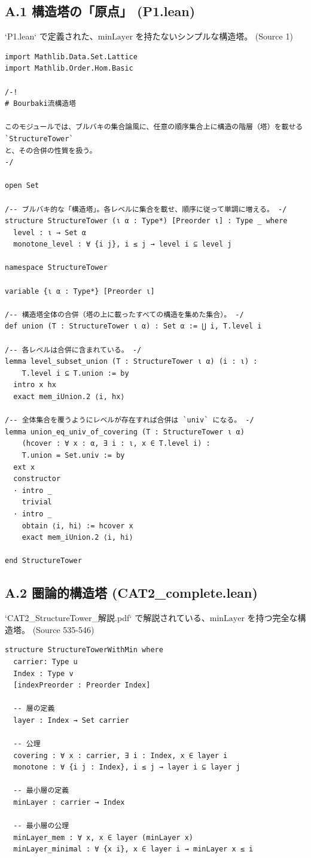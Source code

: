 \documentclass[11pt]{ltjsarticle}
\theoremstyle{definition}
\theoremstyle{plain}
\theoremstyle{remark}
\begin{document}
\subsection{A.1 構造塔の「原点」 (P1.lean)}
`P1.lean` で定義された、$\text{minLayer}$ を持たないシンプルな構造塔。
(Source 1)
\begin{lstlisting}[caption={P1.lean: StructureTower の定義}, label={lst:p1}]
import Mathlib.Data.Set.Lattice
import Mathlib.Order.Hom.Basic

/-!
# Bourbaki流構造塔

このモジュールでは、ブルバキの集合論風に、任意の順序集合上に構造の階層（塔）を載せる `StructureTower`
と、その合併の性質を扱う。
-/

open Set

/-- ブルバキ的な「構造塔」。各レベルに集合を載せ、順序に従って単調に増える。 -/
structure StructureTower (ι α : Type*) [Preorder ι] : Type _ where
  level : ι → Set α
  monotone_level : ∀ {i j}, i ≤ j → level i ⊆ level j

namespace StructureTower

variable {ι α : Type*} [Preorder ι]

/-- 構造塔全体の合併（塔の上に載ったすべての構造を集めた集合）。 -/
def union (T : StructureTower ι α) : Set α := ⋃ i, T.level i

/-- 各レベルは合併に含まれている。 -/
lemma level_subset_union (T : StructureTower ι α) (i : ι) :
    T.level i ⊆ T.union := by
  intro x hx
  exact mem_iUnion.2 ⟨i, hx⟩

/-- 全体集合を覆うようにレベルが存在すれば合併は `univ` になる。 -/
lemma union_eq_univ_of_covering (T : StructureTower ι α)
    (hcover : ∀ x : α, ∃ i : ι, x ∈ T.level i) :
    T.union = Set.univ := by
  ext x
  constructor
  · intro _
    trivial
  · intro _
    obtain ⟨i, hi⟩ := hcover x
    exact mem_iUnion.2 ⟨i, hi⟩

end StructureTower
\end{lstlisting}

\subsection{A.2 圏論的構造塔 (CAT2\_complete.lean)}
`CAT2_StructureTower_解説.pdf` で解説されている、$\text{minLayer}$ を持つ完全な構造塔。
(Source 535-546)
\begin{lstlisting}[caption={CAT2\_complete.lean: StructureTowerWithMin の定義 (抜粋)}, label={lst:cat2}]
structure StructureTowerWithMin where
  carrier: Type u
  Index : Type v
  [indexPreorder : Preorder Index]
  
  -- 層の定義
  layer : Index → Set carrier
  
  -- 公理
  covering : ∀ x : carrier, ∃ i : Index, x ∈ layer i
  monotone : ∀ {i j : Index}, i ≤ j → layer i ⊆ layer j
  
  -- 最小層の定義
  minLayer : carrier → Index
  
  -- 最小層の公理
  minLayer_mem : ∀ x, x ∈ layer (minLayer x)
  minLayer_minimal : ∀ {x i}, x ∈ layer i → minLayer x ≤ i
\end{lstlisting}
\end{document}
